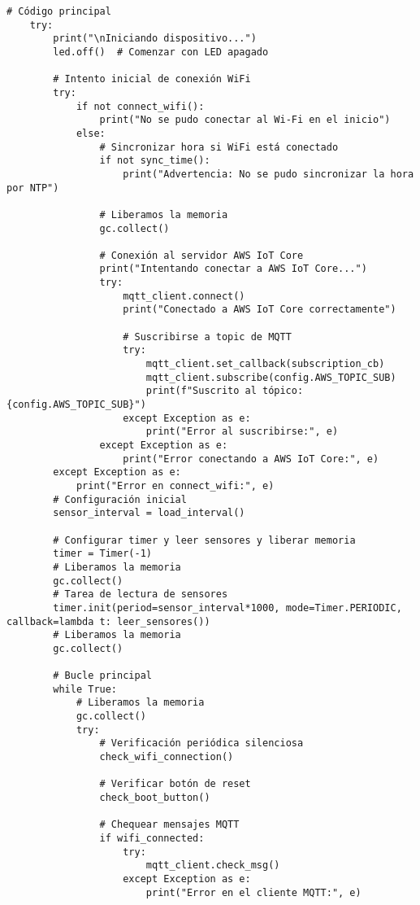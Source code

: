 \begin{lstlisting}[label=cod:firmware,caption=Firmware nodo sensor de consumos. , language=PythonUTF8]
    # Código principal
    try:
        print("\nIniciando dispositivo...")
        led.off()  # Comenzar con LED apagado
        
        # Intento inicial de conexión WiFi
        try:
            if not connect_wifi():
                print("No se pudo conectar al Wi-Fi en el inicio")
            else:
                # Sincronizar hora si WiFi está conectado
                if not sync_time():
                    print("Advertencia: No se pudo sincronizar la hora por NTP")
                
                # Liberamos la memoria
                gc.collect()
                
                # Conexión al servidor AWS IoT Core
                print("Intentando conectar a AWS IoT Core...")
                try:
                    mqtt_client.connect()
                    print("Conectado a AWS IoT Core correctamente")
                    
                    # Suscribirse a topic de MQTT
                    try:
                        mqtt_client.set_callback(subscription_cb)
                        mqtt_client.subscribe(config.AWS_TOPIC_SUB)
                        print(f"Suscrito al tópico: {config.AWS_TOPIC_SUB}")
                    except Exception as e:
                        print("Error al suscribirse:", e)
                except Exception as e:
                    print("Error conectando a AWS IoT Core:", e)
        except Exception as e:
            print("Error en connect_wifi:", e)
        # Configuración inicial
        sensor_interval = load_interval()
        
        # Configurar timer y leer sensores y liberar memoria
        timer = Timer(-1)
        # Liberamos la memoria
        gc.collect()
        # Tarea de lectura de sensores
        timer.init(period=sensor_interval*1000, mode=Timer.PERIODIC, callback=lambda t: leer_sensores())
        # Liberamos la memoria
        gc.collect()
            
        # Bucle principal
        while True:
            # Liberamos la memoria
            gc.collect()
            try:
                # Verificación periódica silenciosa
                check_wifi_connection()
                            
                # Verificar botón de reset
                check_boot_button()
                    
                # Chequear mensajes MQTT
                if wifi_connected:
                    try:
                        mqtt_client.check_msg()
                    except Exception as e:
                        print("Error en el cliente MQTT:", e)
                

\end{lstlisting}
